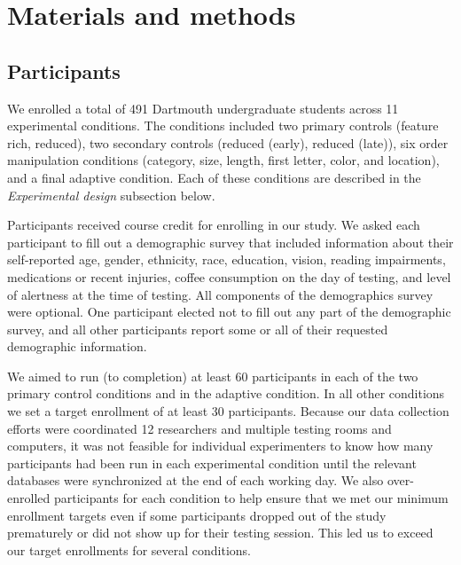 \documentclass[11pt]{article}
\begin{document}
\section*{Materials and methods}

\subsection*{Participants}

We enrolled a total of 491 Dartmouth undergraduate students across 11
experimental conditions. The conditions included two primary controls (feature
rich, reduced), two secondary controls (reduced (early), reduced (late)), six
order manipulation conditions (category, size, length, first letter, color, and
location), and a final adaptive condition. Each of these conditions are
described in the \textit{Experimental design} subsection below.

Participants received course credit for enrolling in our study. We asked each
participant to fill out a demographic survey that included information about
their self-reported age, gender, ethnicity, race, education, vision, reading
impairments, medications or recent injuries, coffee consumption on the day of
testing, and level of alertness at the time of testing. All components of the
demographics survey were optional. One participant elected not to fill out any
part of the demographic survey, and all other participants report some or all
of their requested demographic information.

We aimed to run (to completion) at least 60 participants in each of the two
primary control conditions and in the adaptive condition. In all other
conditions we set a target enrollment of at least 30 participants. Because our
data collection efforts were coordinated 12 researchers and multiple testing
rooms and computers, it was not feasible for individual experimenters to know
how many participants had been run in each experimental condition until the
relevant databases were synchronized at the end of each working day. We also
over-enrolled participants for each condition to help ensure that we met our
minimum enrollment targets even if some participants dropped out of the study
prematurely or did not show up for their testing session. This led us to exceed
our target enrollments for several conditions.
\end{document}

